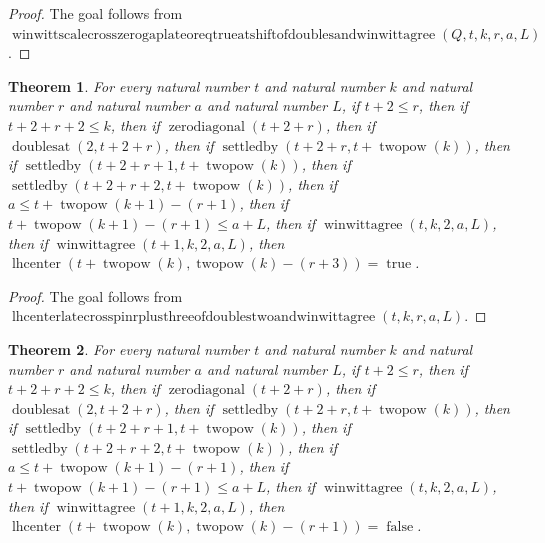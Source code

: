 \documentclass[11pt]{article}
\newtheorem{theorem}{Theorem}[section]
\theoremstyle{definition}
\begin{document}
\begin{proof}
The goal follows from \(\operatorname{winwittscalecrosszerogaplateoreqtrueatshiftofdoublesandwinwittagree}(Q, t, k, r, a, L)\).
\end{proof}
\begin{theorem}
\label{ll:paper:lhcenter-late-cross-pin-r-plus-three-of-doubles-two-and-winwittagree}
For every natural number \(t\) and natural number \(k\) and natural number \(r\) and natural number \(a\) and natural number \(L\), if \(t + 2 \le r\), then if \(t + 2 + r + 2 \le k\), then if \(\operatorname{zerodiagonal}(t + 2 + r)\), then if \(\operatorname{doublesat}(2, t + 2 + r)\), then if \(\operatorname{settledby}(t + 2 + r, t + \operatorname{twopow}(k))\), then if \(\operatorname{settledby}(t + 2 + r + 1, t + \operatorname{twopow}(k))\), then if \(\operatorname{settledby}(t + 2 + r + 2, t + \operatorname{twopow}(k))\), then if \(a \le t + \operatorname{twopow}(k + 1) - (r + 1)\), then if \(t + \operatorname{twopow}(k + 1) - (r + 1) \le a + L\), then if \(\operatorname{winwittagree}(t, k, 2, a, L)\), then if \(\operatorname{winwittagree}(t + 1, k, 2, a, L)\), then \(\operatorname{lhcenter}(t + \operatorname{twopow}(k), \operatorname{twopow}(k) - (r + 3)) = \operatorname{true}\).
\end{theorem}
\begin{proof}
The goal follows from \(\operatorname{lhcenterlatecrosspinrplusthreeofdoublestwoandwinwittagree}(t, k, r, a, L)\).
\end{proof}
\begin{theorem}
\label{ll:paper:lhcenter-late-cross-pin-r-plus-one-false-of-doubles-two-and-winwittagree}
For every natural number \(t\) and natural number \(k\) and natural number \(r\) and natural number \(a\) and natural number \(L\), if \(t + 2 \le r\), then if \(t + 2 + r + 2 \le k\), then if \(\operatorname{zerodiagonal}(t + 2 + r)\), then if \(\operatorname{doublesat}(2, t + 2 + r)\), then if \(\operatorname{settledby}(t + 2 + r, t + \operatorname{twopow}(k))\), then if \(\operatorname{settledby}(t + 2 + r + 1, t + \operatorname{twopow}(k))\), then if \(\operatorname{settledby}(t + 2 + r + 2, t + \operatorname{twopow}(k))\), then if \(a \le t + \operatorname{twopow}(k + 1) - (r + 1)\), then if \(t + \operatorname{twopow}(k + 1) - (r + 1) \le a + L\), then if \(\operatorname{winwittagree}(t, k, 2, a, L)\), then if \(\operatorname{winwittagree}(t + 1, k, 2, a, L)\), then \(\operatorname{lhcenter}(t + \operatorname{twopow}(k), \operatorname{twopow}(k) - (r + 1)) = \operatorname{false}\).
\end{theorem}
\end{document}

